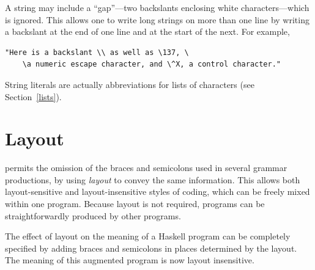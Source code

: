 A string may include a ``gap''---two backslants enclosing
white characters---which is ignored.
This allows one to write long strings on more than one line by writing
a backslant at the end of one line and at the start of the next.  For
example,
\bprog
{\small\begin{verbatim}
"Here is a backslant \\ as well as \137, \
    \a numeric escape character, and \^X, a control character."
\end{verbatim}}
\eprogNoSkip

String literals are actually abbreviations for lists of characters
(see Section~\ref{lists}).

\section{Layout}
\label{lexemes-layout}

\Haskell{} permits the omission of the braces and semicolons used in several
grammar productions, by
using {\em layout} to convey the same information.  This allows both
layout-sensitive and layout-insensitive styles of coding, which
can be freely mixed within one program.  Because layout is
not required, \Haskell{} programs can be straightforwardly
produced by other programs.

The effect of layout on the meaning of a Haskell program
can be completely specified by adding
braces and semicolons in places determined by the layout.  The meaning of
this augmented program is now layout insensitive.

